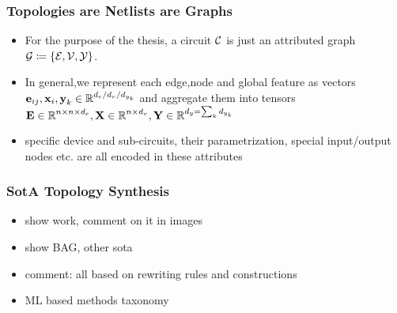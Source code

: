 \documentclass[./presentation.tex]{subfiles}
\begin{document}
\begin{frame}[label=working]
  \frametitle{Topologies are Netlists are Graphs}
  \begin{itemize}
    \item For the purpose of the thesis, a circuit $\operatorname{\mathcal{C}}$ is just an attributed graph ${\mathcal{G}}\coloneq \lbrace{\mathcal{E}},{\mathcal{V}},{\mathcal{Y}} \rbrace$.
    \item In general,we represent each edge,node and global feature as vectors $\operatorname{\mathbf{e}}_{ij},\operatorname{\mathbf{x}}_i,\operatorname{\mathbf{y}}_k \in \operatorname{\mathbb{R}}^{d_e/d_v/d_{y_k}}$ and aggregate them into tensors $\operatorname{\mathbf{E}}\in\operatorname{\mathbb{R}}^{n\times n \times d_e},\operatorname{\mathbf{X}}\in\operatorname{\mathbb{R}}^{n\times d_v},\operatorname{\mathbf{Y}}\in\operatorname{\mathbb{R}}^{d_y=\sum_k d_{y_k}}$
    \item specific device and sub-circuits, their parametrization, special input/output nodes etc. are all encoded in these attributes
  \end{itemize}
\end{frame}

\begin{frame}[label=working]
\frametitle{SotA Topology Synthesis}
\begin{itemize}
  \item show \cite{zhaoAutomatedTopologySynthesis2022a} work, comment on it in images
  \item show BAG, other sota
  \item comment: all based on rewriting rules and constructions
  \item ML based methods taxonomy
\end{itemize}
\end{frame}
\fi

  
\end{document}
